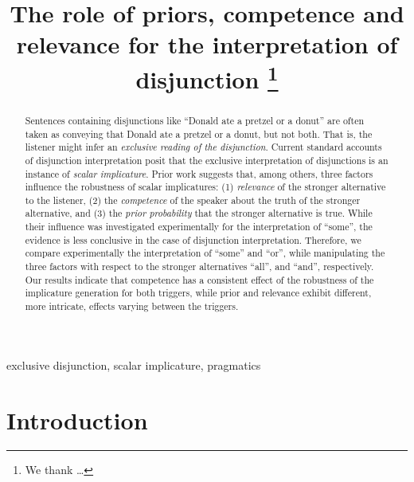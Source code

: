 \documentclass{sp}
\title[Exclusive disjunction]{The role of priors, competence and relevance for the interpretation of disjunction%
  \thanks{We thank \ldots}}
\author[]{%
  \spauthor{Michael Franke \\ \institute{Institute1}} \AND
  \spauthor{Bob van Tiel \\ \institute{Institute2}} \AND
  \spauthor{Polina Tsvilodub \\ \institute{Institute3}}}
\begin{document}
\maketitle

\begin{abstract}
  
  Sentences containing disjunctions like ``Donald ate a pretzel or a donut'' are often taken as conveying that Donald ate a pretzel or a donut, but not both. That is, the listener might infer an \textit{exclusive reading of the disjunction}. Current standard accounts of disjunction interpretation posit that the exclusive interpretation of disjunctions is an instance of \textit{scalar implicature}. Prior work suggests that, among others, three factors influence the robustness of scalar implicatures: (1) \textit{relevance} of the stronger alternative to the listener, (2) the \textit{competence} of the speaker about the truth of the stronger alternative, and (3) the \textit{prior probability} that the stronger alternative is true. While their influence was investigated experimentally for the interpretation of ``some'', the evidence is less conclusive in the case of disjunction interpretation. Therefore, we compare experimentally the interpretation of ``some'' and ``or'', while manipulating the three factors with respect to the stronger alternatives “all”, and “and”, respectively. Our results indicate that competence has a consistent effect of the robustness of the implicature generation for both triggers, while prior and relevance exhibit different, more intricate, effects varying between the triggers.
  
\end{abstract}

\begin{keywords}
 exclusive disjunction, scalar implicature, pragmatics
\end{keywords}

\section{Introduction}
\end{document}
